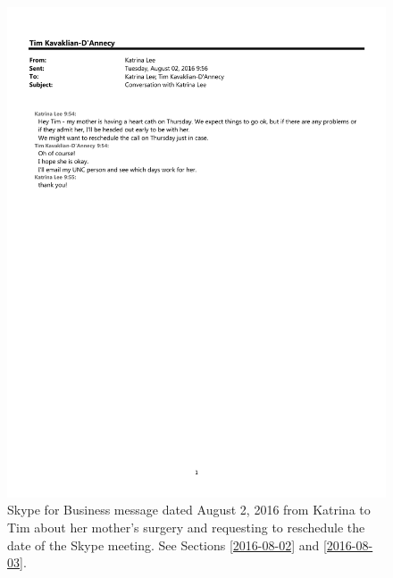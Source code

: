 \begin{figure}
  \centering
  \noindent\includegraphics[page=1,angle=-90,origin=c,width=.75\textwidth,height=.75\textheight]{documents/2016-08-02-Message-Katrina-Tim}
 \caption{Skype for Business message dated August 2, 2016 from Katrina to Tim about her mother's surgery and requesting to reschedule the date of the Skype meeting. See Sections \protect\ref{2016-08-02} and \protect\ref{2016-08-03}.}
 \label{fig:2016-08-02-Message-Katrina-Tim}
\end{figure}

